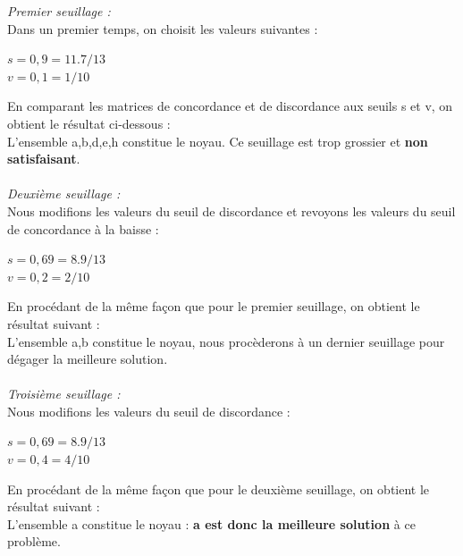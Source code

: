 \documentclass[a4paper, 11pt]{article}
\begin{document}
\emph{Premier seuillage :}\\
Dans un premier temps, on choisit les valeurs suivantes : 
\begin{center}
\textbf{$s = 0,9 = 11.7/13$\\
$v= 0,1 = 1/10$}
\end{center}
En comparant les matrices de concordance et de discordance aux seuils s et v, on obtient le résultat ci-dessous :\\
L’ensemble {a,b,d,e,h} constitue le noyau. Ce seuillage est trop grossier et \textbf{non satisfaisant}.\\\\

\emph{Deuxième seuillage :}\\
Nous modifions les valeurs du seuil de discordance et revoyons les valeurs du seuil de concordance à la baisse :\\
\begin{center}
\textbf{$s = 0,69 = 8.9/13$\\
$v= 0,2 = 2/10$}
\end{center}
En procédant de la même façon que pour le premier seuillage, on obtient le résultat suivant :\\
L’ensemble {a,b} constitue le noyau, nous procèderons à un dernier seuillage pour dégager la meilleure solution.\\\\

\emph{Troisième seuillage :}\\
Nous modifions les valeurs du seuil de discordance :\\
\begin{center}
\textbf{$s = 0,69 = 8.9/13$\\
$v= 0,4 = 4/10$}
\end{center}
En procédant de la même façon que pour le deuxième seuillage, on obtient le résultat suivant :\\
L’ensemble {a} constitue le noyau : \textbf{a est donc la meilleure solution} à ce problème.\\
\newpage
\end{document}
